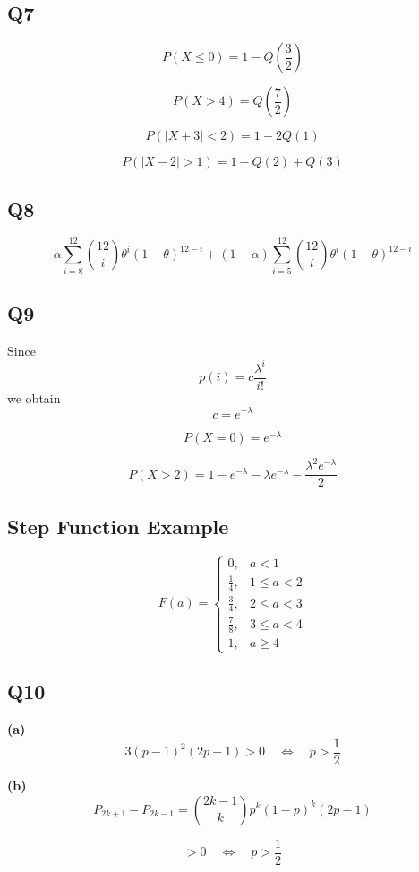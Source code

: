 \documentclass[12pt]{article}
\begin{document}
\subsection*{Q7}

\[
P(X \le 0) = 1 - Q\left(\frac{3}{2}\right)
\]

\[
P(X > 4) = Q\left(\frac{7}{2}\right)
\]

\[
P(|X+3|<2) = 1 - 2Q(1)
\]

\[
P(|X-2|>1) = 1 - Q(2) + Q(3)
\]

\subsection*{Q8}

\[
\alpha \sum_{i=8}^{12} 
\binom{12}{i} \theta^i (1-\theta)^{12-i}
+
(1-\alpha)
\sum_{i=5}^{12}
\binom{12}{i} \theta^i (1-\theta)^{12-i}
\]

\subsection*{Q9}

Since
\[
p(i)=c\frac{\lambda^i}{i!}
\]
we obtain
\[
c=e^{-\lambda}
\]

\[
P(X=0)=e^{-\lambda}
\]

\[
P(X>2)=1-e^{-\lambda}-\lambda e^{-\lambda}-\frac{\lambda^2 e^{-\lambda}}{2}
\]

\subsection*{Step Function Example}

\[
F(a)=
\begin{cases}
0, & a<1 \\
\frac14, & 1\le a<2 \\
\frac34, & 2\le a<3 \\
\frac78, & 3\le a<4 \\
1, & a\ge4
\end{cases}
\]

\subsection*{Q10}

\textbf{(a)}
\[
3(p-1)^2(2p-1)>0
\quad \Longleftrightarrow \quad
p>\frac12
\]

\textbf{(b)}
\[
P_{2k+1}-P_{2k-1}
=
\binom{2k-1}{k}
p^k(1-p)^k(2p-1)
\]

\[
>0
\quad \Longleftrightarrow \quad
p>\frac12
\]
\end{document}
